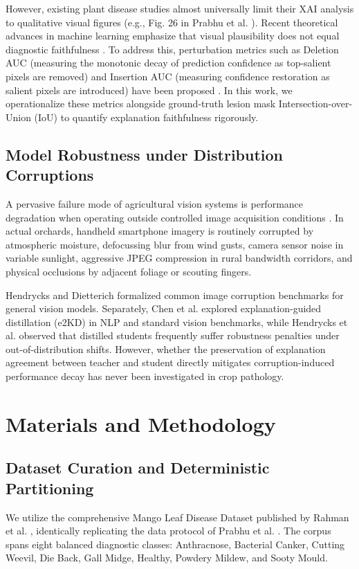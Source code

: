 \documentclass[journal,10pt,twocolumn]{article}
\begin{document}
However, existing plant disease studies almost universally limit their XAI analysis to qualitative visual figures (e.g., Fig. 26 in Prabhu et al. \cite{prabhu2025investigation}). Recent theoretical advances in machine learning emphasize that visual plausibility does not equal diagnostic faithfulness \cite{petsiuk2018rise}. To address this, perturbation metrics such as Deletion AUC (measuring the monotonic decay of prediction confidence as top-salient pixels are removed) and Insertion AUC (measuring confidence restoration as salient pixels are introduced) have been proposed \cite{petsiuk2018rise}. In this work, we operationalize these metrics alongside ground-truth lesion mask Intersection-over-Union (IoU) to quantify explanation faithfulness rigorously.

\subsection{Model Robustness under Distribution Corruptions}
A pervasive failure mode of agricultural vision systems is performance degradation when operating outside controlled image acquisition conditions \cite{hendrycks2019benchmarking}. In actual orchards, handheld smartphone imagery is routinely corrupted by atmospheric moisture, defocussing blur from wind gusts, camera sensor noise in variable sunlight, aggressive JPEG compression in rural bandwidth corridors, and physical occlusions by adjacent foliage or scouting fingers. 

Hendrycks and Dietterich \cite{hendrycks2019benchmarking} formalized common image corruption benchmarks for general vision models. Separately, Chen et al. \cite{chen2024e2kd} explored explanation-guided distillation (e2KD) in NLP and standard vision benchmarks, while Hendrycks et al. \cite{hendrycks2020benchmarking} observed that distilled students frequently suffer robustness penalties under out-of-distribution shifts. However, whether the preservation of explanation agreement between teacher and student directly mitigates corruption-induced performance decay has never been investigated in crop pathology.

\section{Materials and Methodology}
\label{sec:methodology}

\subsection{Dataset Curation and Deterministic Partitioning}
We utilize the comprehensive Mango Leaf Disease Dataset published by Rahman et al. \cite{rahman2024mango}, identically replicating the data protocol of Prabhu et al. \cite{prabhu2025investigation}. The corpus spans eight balanced diagnostic classes: Anthracnose, Bacterial Canker, Cutting Weevil, Die Back, Gall Midge, Healthy, Powdery Mildew, and Sooty Mould. 
\end{document}

